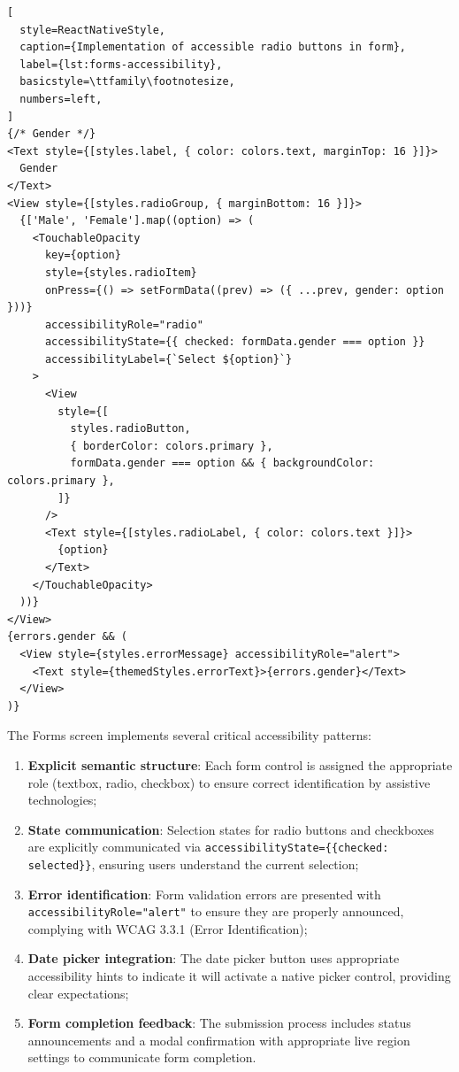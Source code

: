\begin{lstlisting}[
  style=ReactNativeStyle,
  caption={Implementation of accessible radio buttons in form},
  label={lst:forms-accessibility},
  basicstyle=\ttfamily\footnotesize,
  numbers=left,
]
{/* Gender */}
<Text style={[styles.label, { color: colors.text, marginTop: 16 }]}>
  Gender
</Text>
<View style={[styles.radioGroup, { marginBottom: 16 }]}>
  {['Male', 'Female'].map((option) => (
    <TouchableOpacity
      key={option}
      style={styles.radioItem}
      onPress={() => setFormData((prev) => ({ ...prev, gender: option }))}
      accessibilityRole="radio"
      accessibilityState={{ checked: formData.gender === option }}
      accessibilityLabel={`Select ${option}`}
    >
      <View
        style={[
          styles.radioButton,
          { borderColor: colors.primary },
          formData.gender === option && { backgroundColor: colors.primary },
        ]}
      />
      <Text style={[styles.radioLabel, { color: colors.text }]}>
        {option}
      </Text>
    </TouchableOpacity>
  ))}
</View>
{errors.gender && (
  <View style={styles.errorMessage} accessibilityRole="alert">
    <Text style={themedStyles.errorText}>{errors.gender}</Text>
  </View>
)}
\end{lstlisting}

The Forms screen implements several critical accessibility patterns:

\begin{enumerate}
    \item \textbf{Explicit semantic structure}: Each form control is assigned the appropriate role (textbox, radio, checkbox) to ensure correct identification by assistive technologies;
    
    \item \textbf{State communication}: Selection states for radio buttons and checkboxes are explicitly communicated via \texttt{accessibilityState=\{\{checked: selected\}\}}, ensuring users understand the current selection;
    
    \item \textbf{Error identification}: Form validation errors are presented with \texttt{accessibilityRole="alert"} to ensure they are properly announced, complying with WCAG 3.3.1 (Error Identification);
    
    \item \textbf{Date picker integration}: The date picker button uses appropriate accessibility hints to indicate it will activate a native picker control, providing clear expectations;
    
    \item \textbf{Form completion feedback}: The submission process includes status announcements and a modal confirmation with appropriate live region settings to communicate form completion.
\end{enumerate}

